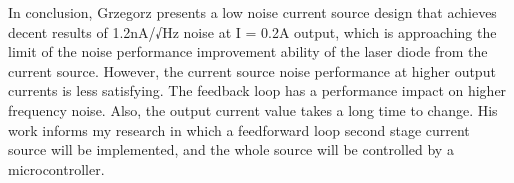 In conclusion, Grzegorz presents a low noise current source design that achieves decent results of 1.2nA/√Hz noise at I = 0.2A output, which is approaching the limit of the noise performance improvement ability of the laser diode from the current source.  However, the current source noise performance at higher output currents is less satisfying.  The feedback loop has a performance impact on higher frequency noise.  Also, the output current value takes a long time to change.  His work informs my research in which a feedforward loop second stage current source will be implemented, and the whole source will be controlled by a microcontroller.



























 













